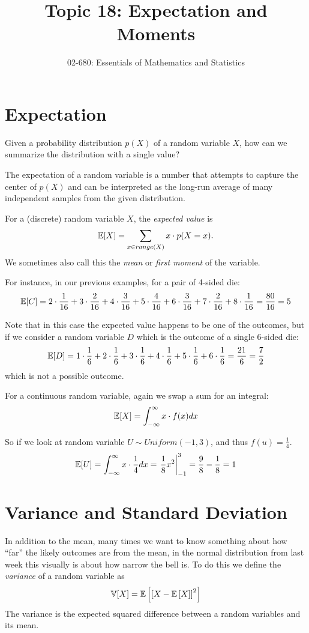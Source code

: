


\title{Topic 18: Expectation and Moments}
\author{02-680: Essentials of Mathematics and Statistics}


\maketitle

\section{Expectation}
Given a probability distribution $p(X)$ of a random variable $X$, how can we summarize the distribution with a single value? 

The expectation of a random variable is a number that attempts to capture the center of $p(X)$ 
and can be interpreted as the long-run average of many independent samples from the given distribution.

For a (discrete) random variable $X$, the \emph{expected value} is 
\[\operatorname{\mathbb{E}}[X] = \sum_{x\in range(X)} x \cdot p(X=x).\]
We sometimes also call this the \emph{mean} or \emph{first moment} of the variable. 

For instance, in our previous examples, for a pair of 4-sided die: 
\[\operatorname{\mathbb{E}}[C] = 2 \cdot \frac{1}{16} + 3  \cdot \frac{2}{16} + 4 \cdot\frac{3}{16} + 5\cdot\frac{4}{16} + 6\cdot\frac{3}{16} + 7\cdot\frac{2}{16} + 8 \cdot \frac{1}{16} = \frac{80}{16} = 5\]

Note that in this case the expected value happens to be one of the outcomes, 
but if we consider a random variable $D$ which is the outcome of a single 6-sided die: 
\[\operatorname{\mathbb{E}}[D] = 1 \cdot \frac{1}{6} + 2 \cdot \frac{1}{6} + 3 \cdot \frac{1}{6} + 4 \cdot \frac{1}{6} + 5 \cdot \frac{1}{6} + 6 \cdot \frac{1}{6} = \frac{21}{6} = \frac{7}{2}\]
which is not a possible outcome. 

For a continuous random variable, again we swap a sum for an integral:
\[\operatorname{\mathbb{E}}[X] = \int_{-\infty}^\infty x \cdot f(x) dx\]

So if we look at random variable $U\sim Uniform(-1,3)$, and thus $f(u)=\frac{1}{4}$. 
\[\operatorname{\mathbb{E}}[U] = \int_{-\infty}^\infty x \cdot \frac{1}{4} dx = \left.\frac{1}{8} x^2 \right|_{-1}^3 = \frac{9}{8} - \frac{1}{8} = 1\]

\section{Variance and Standard Deviation}
In addition to the mean, many times we want to know something about how ``far'' the likely outcomes are from the mean,
in the normal distribution from last week this visually is about how narrow the bell is. 
To do this we define the \emph{variance} of a random variable as  
\[\operatorname{\mathbb{V}}[X] = \operatorname{\mathbb{E}}\left[\left[X-\operatorname{\mathbb{E}}\left[X\right]\right]^2\right]\]
The variance is the expected squared difference between a random variables and its mean. 

